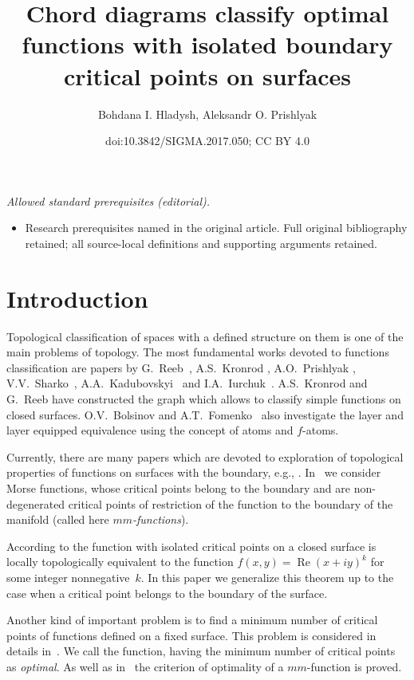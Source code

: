 \documentclass[10pt,a4paper]{amsart}
\title{Chord diagrams classify optimal functions with isolated boundary critical points on surfaces}
\author{Bohdana I. Hladysh, Aleksandr O. Prishlyak}
\date{doi:10.3842/SIGMA.2017.050; CC BY 4.0}
\numberwithin{equation}{section}
\begin{document}
\maketitle
\noindent\textit{Allowed standard prerequisites (editorial).}\begin{itemize}
\item Research prerequisites named in the original article. Full original bibliography retained; all source-local definitions and supporting arguments retained.
\end{itemize}\medskip
\section{Introduction}

Topological classif\/ication of spaces with a def\/ined structure on them is one of the main problems of topology. The most fundamental works devoted to functions classif\/ication are papers by G.~Reeb~\cite{Reeb}, A.S.~Kronrod \cite{Kronrod}, A.O.~Prishlyak \cite{Prishlyak}, V.V.~Sharko~\cite{Sharko}, A.A.~Kadubovskyi~\cite{Kadubovskyi2015} and I.A.~Iurchuk~\cite{Iurchuk}. A.S.~Kronrod and G.~Reeb have constructed the graph which allows to classify simple functions on closed surfaces. O.V.~Bolsinov and A.T.~Fomenko~\cite{Bolsinov/Fomenko} also investigate the layer and layer equipped equivalence using the concept of atoms and $f$-atoms.

Currently, there are many papers which are devoted to exploration of topological properties of functions on surfaces with the boundary, e.g., \cite{Hladysh/Prishlyak,Lukova/PrishlyakA/PrishlyakK,Maksumenko/Polulyakh,Vyatchaninova}. In~\cite{Hladysh/Prishlyak} we consider Morse functions, whose critical points belong to the boundary and are non-degenerated critical points of restriction of the function to the boundary of the manifold (called here $mm$\emph{-functions}).

According to \cite[Theorem~1.3]{Prishlyak2002} the function with isolated critical points on a closed surface is locally topologically equivalent to the function $f(x,y)=\operatorname{Re}(x+iy)^{k}$ for some integer non\-ne\-ga\-tive~$k$. In this paper we generalize this theorem up to the case when a critical point belongs to the boundary of the surface.

Another kind of important problem is to f\/ind a minimum number of critical points of functions def\/ined on a f\/ixed surface. This problem is considered in details in~\cite{Hladysh/Prishlyak,Lukova}. We call the function, having the minimum number of critical points as \emph{optimal}. As well as in~\cite{Hladysh/Prishlyak} the criterion of optimality of a $mm$-function is proved.
\end{document}

